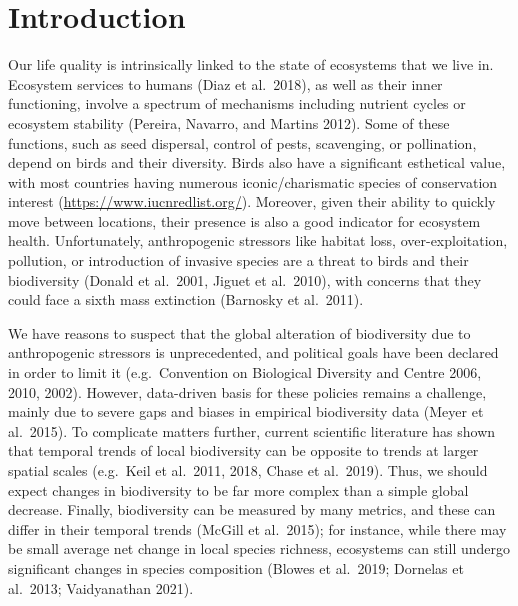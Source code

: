\documentclass[
  12pt,
  oneside]{report}
\author{François Leroy, PhD student at CZU}
\date{2021-09-29}
\begin{document}


\cleardoublepage 
{}

{
\hypersetup{linkcolor=}
\setcounter{tocdepth}{1}
\tableofcontents
\newpage
}
\vspace{50mm}


\cleardoublepage 
{}


\hypertarget{introduction}{%
\chapter{Introduction}\label{introduction}}

Our life quality is intrinsically linked to the state of ecosystems that we live in. Ecosystem services to humans (Diaz et al.~2018), as well as their inner functioning, involve a spectrum of mechanisms including nutrient cycles or ecosystem stability (Pereira, Navarro, and Martins 2012). Some of these functions, such as seed dispersal, control of pests, scavenging, or pollination, depend on birds and their diversity. Birds also have a significant esthetical value, with most countries having numerous iconic/charismatic species of conservation interest (\url{https://www.iucnredlist.org/}). Moreover, given their ability to quickly move between locations, their presence is also a good indicator for ecosystem health. Unfortunately, anthropogenic stressors like habitat loss, over-exploitation, pollution, or introduction of invasive species are a threat to birds and their biodiversity (Donald et al.~2001, Jiguet et al.~2010), with concerns that they could face a sixth mass extinction (Barnosky et al.~2011).

We have reasons to suspect that the global alteration of biodiversity due to anthropogenic stressors is unprecedented, and political goals have been declared in order to limit it (e.g.~Convention on Biological Diversity and Centre 2006, 2010, 2002). However, data-driven basis for these policies remains a challenge, mainly due to severe gaps and biases in empirical biodiversity data (Meyer et al.~2015). To complicate matters further, current scientific literature has shown that temporal trends of local biodiversity can be opposite to trends at larger spatial scales (e.g.~Keil et al.~2011, 2018, Chase et al.~2019). Thus, we should expect changes in biodiversity to be far more complex than a simple global decrease. Finally, biodiversity can be measured by many metrics, and these can differ in their temporal trends (McGill et al.~2015); for instance, while there may be small average net change in local species richness, ecosystems can still undergo significant changes in species composition (Blowes et al.~2019; Dornelas et al.~2013; Vaidyanathan 2021).
\end{document}
